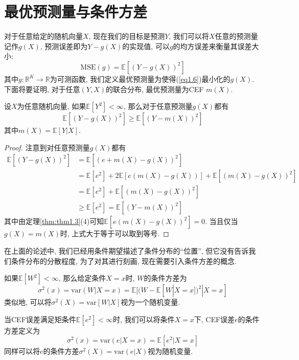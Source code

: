 \documentclass[cn, 12pt, math=mtpro2, bibstyle=apa, blue, twocol]{elegantbook}
\newcommand{\R}{\mathbb{R}}
\newcommand{\E}{\mathbb{E}}
\newcommand{\MSE}{\text{MSE}}
\begin{document}
\section{最优预测量与条件方差}
对于任意给定的随机向量$X$, 现在我们的目标是预测$Y$, 我们可以将$X$任意的预测量记作$g(X)$, 预测误差即为$Y-g(X)$的实现值, 可以$g$的均方误差来衡量其误差大小:
\begin{equation}\label{eq1.6}
 \MSE(g)=\E[(Y-g(X))^2]
\end{equation}
其中$g:\R^K\to\R$为可测函数, 我们定义最优预测量为使得(\ref{eq1.6})最小化的$g(X)$. 下面将要证明, 对于任意$(Y,X)$的联合分布, 最优预测量为CEF $m(X)$.
\begin{theorem}\label{thm:thm1.4}
  设$X$为任意随机向量, 如果$\E[Y^2]<\infty$, 那么对于任意预测量$g(X)$都有
  $$\E[(Y-g(X))^2]\geq\E[(Y-m(X))^2]$$
  其中$m(X)=\E[Y|X]$.
\end{theorem}
\begin{proof}
  注意到对任意预测量$g(X)$都有
  \begin{align*}
  \E[(Y-g(X))^2]&=\E[(e+m(X)-g(X))^2] \\
  &=\E[e^2]+2\E[e(m(X)-g(X))]+\E[(m(X)-g(X))^2] \\
  &=\E[e^2]+\E[(m(X)-g(X))^2] \\
  &\geq \E[e^2]=\E[(Y-m(X))^2]
  \end{align*}
  其中由定理\ref{thm:thm1.3}(4)可知$\E[e(m(X)-g(X))^2]=0$. 当且仅当$g(X)=m(X)$时, 上式大于等于可以取到等号.
\end{proof}

在上面的论述中, 我们已经用条件期望描述了条件分布的“位置”, 但它没有告诉我们条件分布的分散程度, 为了对其进行刻画, 现在需要引入条件方差的概念.
\begin{definition}
如果$\E[W^2]<\infty$, 那么给定条件$X=x$时, $W$的条件方差为
$$\sigma^2(x)=\text{var}(W|X=x)=\E[(W-\E[W|X=x])^2|X=x]$$
类似地, 可以将$\sigma^2(X)=\text{var}[W|X]$视为一个随机变量.
\end{definition}
当CEF误差满足矩条件$\E[e^2]<\infty$时, 我们可以将条件$X=x$下, CEF误差$e$的条件方差定义为
$$\sigma^2(x)=\text{var}(e|X=x)=\E[e^2|X=x]$$
同样可以将$e$的条件方差$\sigma^2(X)=\text{var}(e|X)$视为随机变量.
\end{document}
